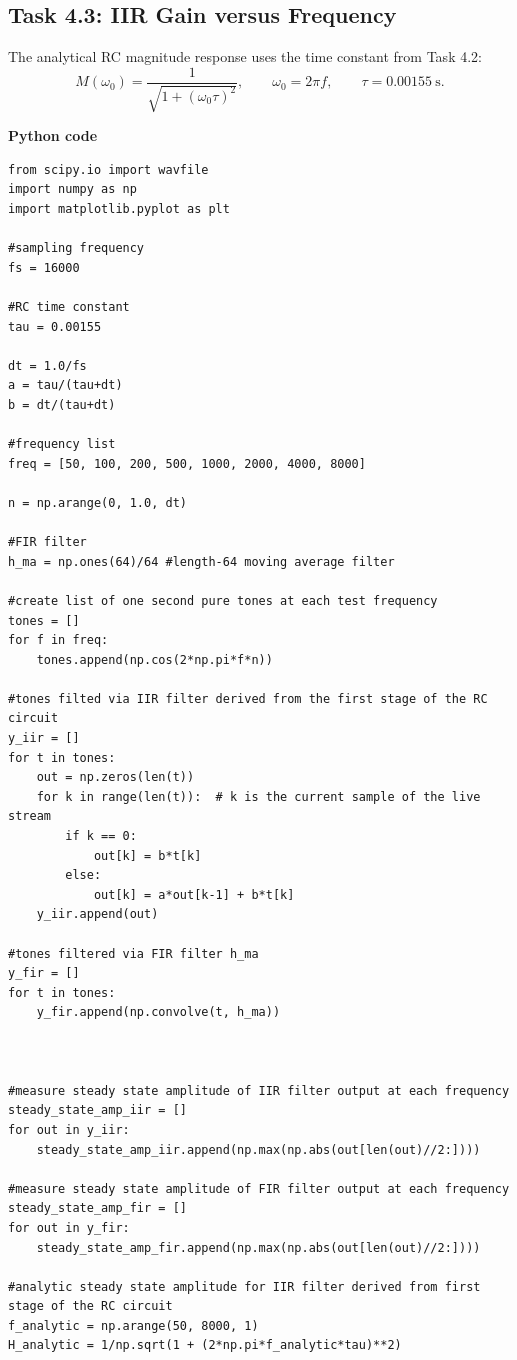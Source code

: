 \documentclass[11pt]{article}
\newcommand{\topic}[1]{\Needspace{4\baselineskip}\par\textbf{#1}\par\nopagebreak}
\begin{document}
\clearpage
\subsection{Task 4.3: IIR Gain versus Frequency}

The analytical RC magnitude response uses the time constant from Task 4.2:
\[
  M(\omega_0)=\frac{1}{\sqrt{1+(\omega_0\tau)^2}},\qquad
  \omega_0=2\pi f,\qquad
  \tau=0.00155\ \text{s}.
\]

\topic{Python code}

\begin{lstlisting}[style=python]
from scipy.io import wavfile
import numpy as np
import matplotlib.pyplot as plt

#sampling frequency
fs = 16000

#RC time constant
tau = 0.00155

dt = 1.0/fs
a = tau/(tau+dt)
b = dt/(tau+dt)

#frequency list
freq = [50, 100, 200, 500, 1000, 2000, 4000, 8000]

n = np.arange(0, 1.0, dt)

#FIR filter
h_ma = np.ones(64)/64 #length-64 moving average filter      

#create list of one second pure tones at each test frequency
tones = []
for f in freq:
    tones.append(np.cos(2*np.pi*f*n))

#tones filted via IIR filter derived from the first stage of the RC circuit
y_iir = []
for t in tones:
    out = np.zeros(len(t))
    for k in range(len(t)):  # k is the current sample of the live stream
        if k == 0:
            out[k] = b*t[k]
        else:
            out[k] = a*out[k-1] + b*t[k]
    y_iir.append(out)

#tones filtered via FIR filter h_ma
y_fir = []
for t in tones:
    y_fir.append(np.convolve(t, h_ma))



#measure steady state amplitude of IIR filter output at each frequency
steady_state_amp_iir = []
for out in y_iir:
    steady_state_amp_iir.append(np.max(np.abs(out[len(out)//2:])))

#measure steady state amplitude of FIR filter output at each frequency
steady_state_amp_fir = []
for out in y_fir:
    steady_state_amp_fir.append(np.max(np.abs(out[len(out)//2:])))

#analytic steady state amplitude for IIR filter derived from first stage of the RC circuit
f_analytic = np.arange(50, 8000, 1)
H_analytic = 1/np.sqrt(1 + (2*np.pi*f_analytic*tau)**2)


\end{lstlisting}
\end{document}
